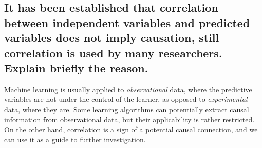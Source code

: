 \documentclass[10pt]{article}
\begin{document}
\subsection{It has been established that correlation between independent
variables and predicted variables does not imply causation, still correlation
is used by many researchers. Explain briefly the reason.}

Machine learning is usually applied to \emph{observational} data, where the
predictive variables are not under the control of the learner, as opposed to
\emph{experimental} data, where they are. Some learning algorithms can
potentially extract causal information from observational data, but their
applicability is rather restricted. On the other hand, correlation is a sign of
a potential causal connection, and we can use it as a guide to further
investigation.

{}

\end{document}
